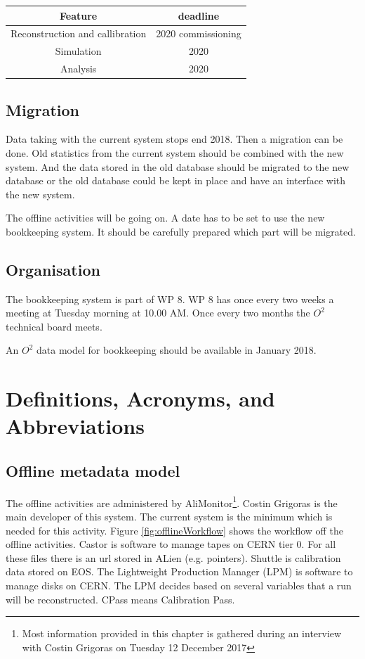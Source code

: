 \begin{tabular}{cc}
\hline
Feature & deadline\\
\hline
\hline
 Reconstruction and callibration  & 2020 commissioning \\
 \hline
Simulation   & 2020\\
\hline
Analysis & 2020\\
\hline
\end{tabular}

\subsection{Migration}
Data taking with the current system stops end 2018. Then a migration can be done. Old statistics from the current system should be combined with the new system. And the data stored in the old database should be migrated to the new database or the old database could be kept in place and have an interface with the new system. 

The offline activities will be going on. A date has to be set to use the new bookkeeping system. It should be carefully prepared which part will be migrated.

\subsection{Organisation}
The bookkeeping system is part of WP 8. WP 8 has once every two weeks a meeting at Tuesday morning at 10.00 AM. Once every two months the $O^2$ technical board meets. 

An $O^2$ data model for bookkeeping should be available in January 2018.



\section{Definitions, Acronyms, and Abbreviations}

\subsection{Offline metadata model}
The offline activities are administered by AliMonitor\footnote{Most information provided in this chapter is gathered during an interview with Costin Grigoras on Tuesday 12 December 2017}. Costin Grigoras is the main developer of this system. The current system is the minimum which is needed for this activity. Figure \ref{fig:offlineWorkflow} shows the workflow off the offline activities. Castor is software to manage tapes on CERN tier 0. For all these files there is an url stored in ALien (e.g. pointers). Shuttle is calibration data stored on EOS. The Lightweight Production Manager (LPM) is software to manage disks on CERN. The LPM decides based on several variables that a run will be reconstructed. CPass means Calibration Pass. 

